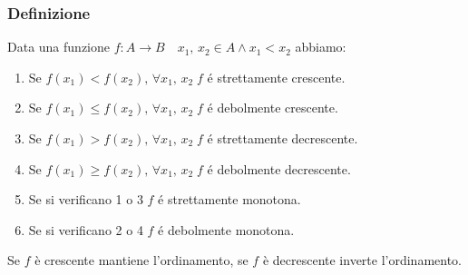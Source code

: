 \documentclass[12pt, a4paper]{article}
\theoremstyle{break}
\begin{document}
    \subsubsection{Definizione}
    Data una funzione $f:A\rightarrow B\quad x_1,\,x_2\in A \wedge x_1<x_2$ abbiamo:
    \begin{enumerate}
        \item Se $f(x_1)<f(x_2),\, \forall x_1,\,x_2\; f$ é strettamente crescente.
        \item Se $f(x_1)\leq f(x_2),\, \forall x_1,\,x_2\; f$ é debolmente crescente.
        \item Se $f(x_1)>f(x_2),\, \forall x_1,\,x_2\; f$ é strettamente decrescente.
        \item Se $f(x_1)\geq f(x_2),\, \forall x_1,\,x_2\; f$ é debolmente decrescente.
        \item Se si verificano 1 o 3 $f$ é strettamente monotona.
        \item Se si verificano 2 o 4 $f$ é debolmente monotona.
    \end{enumerate}
    Se $f$ è crescente mantiene l'ordinamento, se $f$ è decrescente inverte l'ordinamento.
\end{document}
